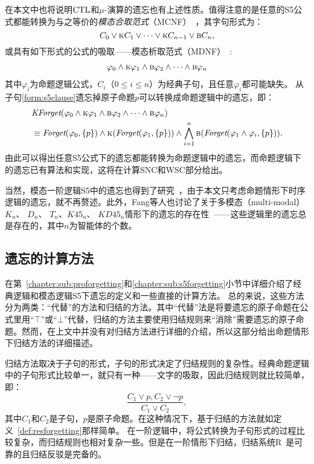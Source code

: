 在本文中也将说明$\textrm{CTL}$和$\mu$-演算的遗忘也有上述性质。值得注意的是任意的S5公式都能转换为与之等价的\emph{模态合取范式}（MCNF）~\cite{DBLP:conf/aaai/Bienvenu07}，其字句形式为：
$$C_0 \vee \textsc{k} C_1 \vee \dots \vee \textsc{k} C_{n-1} \vee \textsc{b} C_n,$$
或具有如下形式的公式的吸取——模态析取范式（MDNF）~\cite{Yongmei:IJCAI:2011,Zhang2008Properties}:
\begin{align}\label{form:s5clause}
	\varphi_0 \wedge \textsc{k} \varphi_1 \wedge \textsc{b} \varphi_2 \wedge \dots \wedge \textsc{b} \varphi_n
\end{align}
其中$\varphi_i$为命题逻辑公式，$C_i$（$0\leq i \leq n$）为经典子句，且任意$\varphi_i$都可能缺失。
从子句\ref{form:s5clause}遗忘掉原子命题$p$可以转换成命题逻辑中的遗忘，即：
\begin{align*}
	&\textit{KForget}(\varphi_0 \wedge \textsc{k} \varphi_1 \wedge \textsc{b} \varphi_2 \wedge \dots \wedge \textsc{b} \varphi_n)\\
	&\equiv \textit{Forget}(\varphi_0, \{p\}) \wedge \textsc{k}(\textit{Forget}(\varphi_1, \{p\})) \wedge \bigwedge_{i=1}^{n}\textsc{b}(\textit{Forget}(\varphi_1 \wedge \varphi_i, \{p\})).
\end{align*}
由此可以得出任意S5公式下的遗忘都能转换为命题逻辑中的遗忘，而命题逻辑下的遗忘已有算法和实现，这将在计算SNC和WSC部分给出。



当然，模态一阶逻辑S5中的遗忘也得到了研究~\cite{Yongmei:IJCAI:2011}，由于本文只考虑命题情形下时序逻辑的遗忘，就不再赘述。此外，Fang等人也讨论了关于多模态（multi-modal）$K_n$、 $D_n$、 $T_n$、$K45_n$、 $KD45_n$情形下的遗忘的存在性~\cite{DBLP:journals/ai/FangLD19}——这些逻辑里的遗忘总是存在的，其中$n$为智能体的个数。

\subsection{遗忘的计算方法}
在第~\ref{chapter:sub:proforgetting}和\ref{chapter:sub:s5forgetting}小节中详细介绍了经典逻辑和模态逻辑S5下遗忘的定义和一些直接的计算方法。
总的来说，这些方法分为两类：“代替”的方法和归结的方法。其中“代替”法是将要遗忘的原子命题在公式里用“$\top$”或“$\bot$”代替，归结的方法主要使用归结规则来“消除”需要遗忘的原子命题。然而，在上文中并没有对归结方法进行详细的介绍，所以这部分给出命题情形下归结方法的详细描述。%

归结方法取决于子句的形式，子句的形式决定了归结规则的复杂性。经典命题逻辑中的子句形式比较单一，就只有一种——文字的吸取，因此归结规则就比较简单，即：
$$\frac{C_1 \vee p, C_2 \vee \neg p}{C_1 \vee C_2},$$
其中$C_1$和$C_2$是子句，$p$是原子命题。在这种情况下，基于归结的方法就如定义~\ref{def:resforgetting}那样简单。
在一阶逻辑中，将公式转换为子句形式的过程比较复杂，而归结规则也相对复杂一些。但是在一阶情形下归结，归结系统R~\cite{gabbay2008second}是可靠的且归结反驳是完备的。



